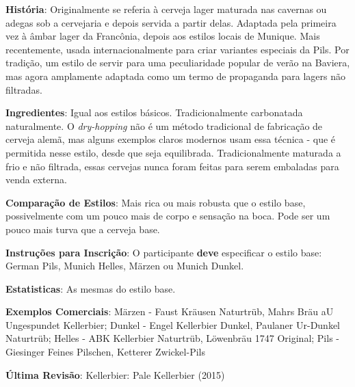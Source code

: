\textbf{História}: Originalmente se referia à cerveja lager maturada nas cavernas ou adegas sob a cervejaria e depois servida a partir delas. Adaptada pela primeira vez à âmbar lager da Francônia, depois aos estilos locais de Munique. Mais recentemente, usada internacionalmente para criar variantes especiais da Pils. Por tradição, um estilo de servir para uma peculiaridade popular de verão na Baviera, mas agora amplamente adaptada como um termo de propaganda para lagers não filtradas.

\textbf{Ingredientes}: Igual aos estilos básicos. Tradicionalmente carbonatada naturalmente. O \textit{dry-hopping} não é um método tradicional de fabricação de cerveja alemã, mas alguns exemplos claros modernos usam essa técnica - que é permitida nesse estilo, desde que seja equilibrada. Tradicionalmente maturada a frio e não filtrada, essas cervejas nunca foram feitas para serem embaladas para venda externa.

\textbf{Comparação de Estilos}: Mais rica ou mais robusta que o estilo base, possivelmente com um pouco mais de corpo e sensação na boca. Pode ser um pouco mais turva que a cerveja base.

\textbf{Instruções para Inscrição}: O participante \textbf{deve} especificar o estilo base: German Pils, Munich Helles, Märzen ou Munich Dunkel.

\textbf{Estatisticas}: As mesmas do estilo base.

\textbf{Exemplos Comerciais}: Märzen - Faust Kräusen Naturtrüb, Mahrs Bräu aU Ungespundet Kellerbier; Dunkel - Engel Kellerbier Dunkel, Paulaner Ur-Dunkel Naturtrüb; Helles - ABK Kellerbier Naturtrüb, Löwenbräu 1747 Original; Pils - Giesinger Feines Pilschen, Ketterer Zwickel-Pils

\textbf{Última Revisão}: Kellerbier: Pale Kellerbier (2015)

